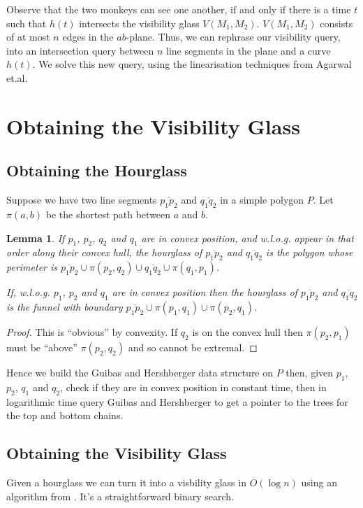 \documentclass{article}
\newtheorem{lemma}{Lemma}
\newcommand{\etal}{et.al\xspace}
\begin{document}
Observe that the two monkeys can see one another, if and only if there is a time $t$ such that $h(t)$ intersects the visibility glass $V(M_1, M_2)$. $V(M_1, M_2)$ consists of at most $n$ edges in the $ab$-plane. Thus, we can rephrase our visibility query, into an intersection query between $n$ line segments in the plane and a curve $h(t)$.
We solve this new query, using the linearisation techniques from Agarwal \etal \cite{agarwal2013range}.

\section{Obtaining the Visibility Glass}

\subsection{Obtaining the Hourglass}

Suppose we have two line segments $\overline{p_1 p_2}$ and $\overline{q_1 q_2}$ in a simple polygon $P$. Let $\pi(a, b)$ be the shortest path between $a$ and $b$.

\begin{lemma}
    If $p_1$, $p_2$, $q_2$ and $q_1$ are in convex position, and w.l.o.g. appear in that order along their convex hull, the hourglass of $\overline{p_1 p_2}$ and $\overline{q_1 q_2}$ is the polygon whose perimeter is $\overline{p_1 p_2} \cup \pi(p_2, q_2) \cup \overline{q_1 q_2} \cup \pi(q_1, p_1)$.
    
    If, w.l.o.g. $p_1$, $p_2$ and $q_1$ are in convex position then the hourglass of $\overline{p_1 p_2}$ and $\overline{q_1 q_2}$ is the funnel with boundary $\overline{p_1 p_2} \cup \pi(p_1, q_1) \cup \pi(p_2, q_1)$.
\end{lemma}

\begin{proof}
This is ``obvious'' by convexity. If $q_2$ is on the convex hull then $\pi(p_2, p_1)$ must be ``above'' $\pi(p_2, q_2)$ and so cannot be extremal.
\end{proof}

Hence we build the Guibas and Hershberger data structure on $P$ then, given $p_1$, $p_2$, $q_1$ and $q_2$, check if they are in convex position in constant time, then in logarithmic time query Guibas and Hershberger to get a pointer to the trees for the top and bottom chains.

\subsection{Obtaining the Visibility Glass}
Given a hourglass we can turn it into a visbility glass in $O(\log n)$ using an algorithm from \cite{GuibasHS91}. It's a straightforward binary search.
\end{document}
